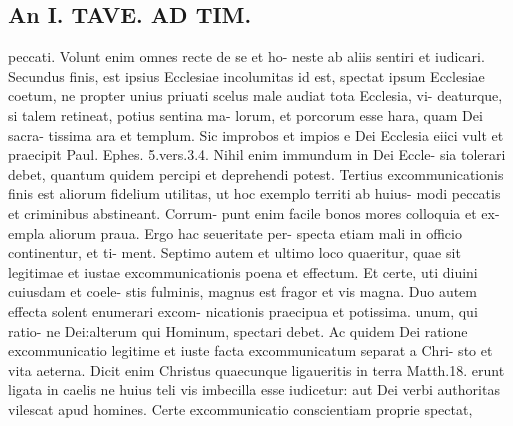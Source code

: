 \documentclass{article}
\begin{document}
\begin{pages}
\section*{An I. TAVE. AD TIM. }
\marginpar{[ p.403 ]}peccati. Volunt enim omnes recte de se et ho- neste ab aliis sentiri et iudicari. Secundus finis, est ipsius Ecclesiae incolumitas id est, spectat ipsum Ecclesiae coetum, ne propter unius priuati scelus male audiat tota Ecclesia, vi- deaturque, si talem retineat, potius sentina ma- lorum, et porcorum esse hara, quam Dei sacra- tissima ara et templum. Sic improbos et impios e Dei Ecclesia eiici vult et praecipit Paul. Ephes. 5.vers.3.4. Nihil enim immundum in Dei Eccle- sia tolerari debet, quantum quidem percipi et deprehendi potest. Tertius excommunicationis finis est aliorum fidelium utilitas, ut hoc exemplo territi ab huius- modi peccatis et criminibus abstineant. Corrum- punt enim facile bonos mores colloquia et ex- empla aliorum praua. Ergo hac seueritate per- specta etiam mali in officio continentur, et ti- ment. Septimo autem et ultimo loco quaeritur, quae sit legitimae et iustae excommunicationis poena et effectum. Et certe, uti diuini cuiusdam et coele- stis fulminis, magnus est fragor et vis magna. Duo autem effecta solent enumerari excom- nicationis praecipua et potissima. unum, qui ratio- ne Dei:alterum qui Hominum, spectari debet. Ac quidem Dei ratione excommunicatio legitime et iuste facta excommunicatum separat a Chri- sto et vita aeterna. Dicit enim Christus quaecunque ligaueritis in terra Matth.18. erunt ligata in caelis ne huius teli vis imbecilla esse iudicetur: aut Dei verbi authoritas vilescat apud homines. Certe excommunicatio conscientiam proprie spectat, 

\end{pages}
\end{document}
